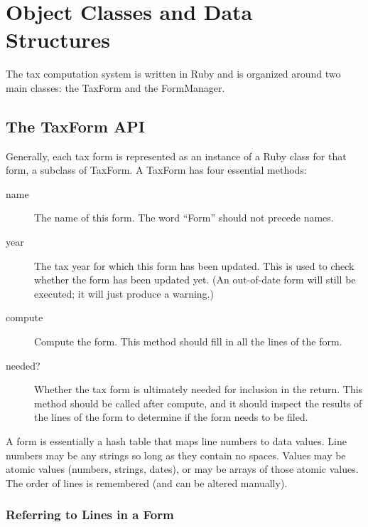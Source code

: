 \documentclass[12pt]{article}
\begin{document}
\section{Object Classes and Data Structures}

The tax computation system is written in Ruby and is organized around two main
classes: the TaxForm and the FormManager.


\subsection{The TaxForm API}

Generally, each tax form is represented as an instance of a Ruby class for that
form, a subclass of TaxForm. A TaxForm has four essential methods:
\begin{description}
\item[name] The name of this form. The word ``Form'' should not precede names.
\item[year] The tax year for which this form has been updated. This is used to
check whether the form has been updated yet. (An out-of-date form will still
be executed; it will just produce a warning.)
\item[compute] Compute the form. This method should fill in all the lines of the
form.
\item[needed?] Whether the tax form is ultimately needed for inclusion in the
return. This method should be called after compute, and it should inspect the
results of the lines of the form to determine if the form needs to be filed.
\end{description}

A form is essentially a hash table that maps line numbers to data values. Line
numbers may be any strings so long as they contain no spaces. Values may be
atomic values (numbers, strings, dates), or may be arrays of those atomic
values. The order of lines is remembered (and can be altered manually).


\subsubsection{Referring to Lines in a Form}
\end{document}
